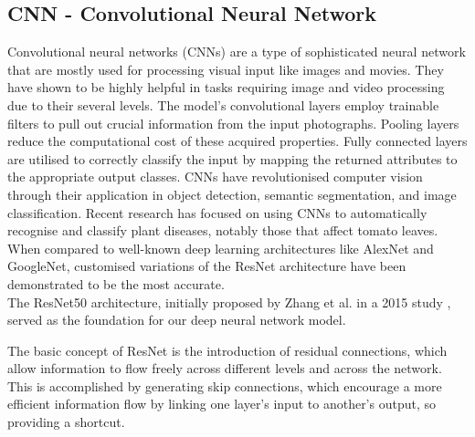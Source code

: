 \documentclass[conference]{IEEEtran}
\begin{document}


\subsection{CNN - Convolutional Neural Network}

Convolutional neural networks (CNNs) are a type of sophisticated neural network that are mostly used for processing visual input like images and movies. They have shown to be highly helpful in tasks requiring image and video processing due to their several levels. The model's convolutional layers employ trainable filters to pull out crucial information from the input photographs. Pooling layers reduce the computational cost of these acquired properties. Fully connected layers are utilised to correctly classify the input by mapping the returned attributes to the appropriate output classes. CNNs have revolutionised computer vision through their application in object detection, semantic segmentation, and image classification. Recent research has focused on using CNNs to automatically recognise and classify plant diseases, notably those that affect tomato leaves. When compared to well-known deep learning architectures like AlexNet and GoogleNet, customised variations of the ResNet architecture have been demonstrated to be the most accurate.\\

The ResNet50 architecture, initially proposed by Zhang et al. in a 2015 study \cite{Zhang_2021_WACV}, served as the foundation for our deep neural network model.

The basic concept of ResNet is the introduction of residual connections, which allow information to flow freely across different levels and across the network. This is accomplished by generating skip connections, which encourage a more efficient information flow by linking one layer's input to another's output, so providing a shortcut.\\
\end{document}
